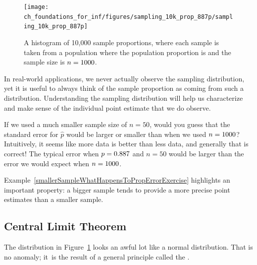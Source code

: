 \begin{figure}
   \centering
   \texttt{[image: ch\_foundations\_for\_inf/figures/sampling\_10k\_prop\_887p/sampling\_10k\_prop\_887p]}
   \caption{A histogram of 10,000 sample proportions, where each
       sample is taken from a population where the population
       proportion is \pewsolarpollprop{} and the sample size is
       $n = 1000{}$.}
   \label{sampling_10k_prop_887p}
\end{figure}

\begin{tipBox}{
  In real-world applications, we never actually observe the
  sampling distribution, yet it is useful to always think of
  the sample proportion as coming from such a distribution.
  Understanding the sampling distribution will help us
  characterize and make sense of the individual point
  estimate that we do observe.}
\end{tipBox}

\begin{example}{If we used a much smaller sample size of $n = 50$,
would you guess that the standard error for $\hat{p}$ would be larger
or smaller than when we used $n = 1000{}$?}
\label{smallerSampleWhatHappensToPropErrorExercise}
Intuitively, it seems like more data is better
than less data, and generally that is correct! The typical error
when $p = 0.887{}$ and $n = 50$ would be larger
than the error we would expect when $n = 1000{}$.
\end{example}

Example~\ref{smallerSampleWhatHappensToPropErrorExercise}
highlights an important property: a bigger sample
tends to provide a more precise point estimates than a smaller sample.



\subsection{Central Limit Theorem}

The distribution in
Figure~\ref{sampling_10k_prop_887p} looks an awful lot like
a normal distribution. That is no anomaly; it~is the result
of a general principle called the .

